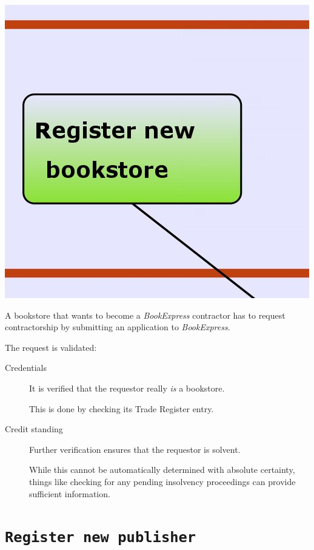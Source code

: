 \includegraphics[scale=0.8]{screenshots/Register_bookstore.jpeg}

A bookstore that wants to become a \emph{BookExpress} contractor has to request contractorship by submitting an application to \emph{BookExpress}.

The request is validated:
\begin{description}
	\item[Credentials] It is verified that the requestor really \emph{is} a bookstore.

	                   This is done by checking its Trade Register entry.
	\item[Credit standing] Further verification ensures that the requestor is solvent.

	                       While this cannot be automatically determined with absolute certainty, things like checking for any pending
						   insolvency proceedings can provide sufficient information.
\end{description}


\section{\texttt{Register new publisher}}

